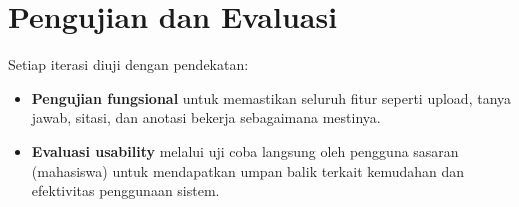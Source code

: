 \section{Pengujian dan Evaluasi}
Setiap iterasi diuji dengan pendekatan:
\begin{itemize}
  \item \textbf{Pengujian fungsional} untuk memastikan seluruh fitur seperti upload, tanya jawab, sitasi, dan anotasi bekerja sebagaimana mestinya.
  \item \textbf{Evaluasi usability} melalui uji coba langsung oleh pengguna sasaran (mahasiswa) untuk mendapatkan umpan balik terkait kemudahan dan efektivitas penggunaan sistem.
\end{itemize}
